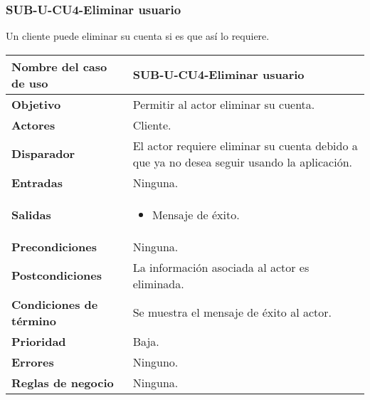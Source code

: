 \subsubsection{SUB-U-CU4-Eliminar usuario}\label{SUB-U-CU4}
Un cliente puede eliminar su cuenta si es que así lo requiere.

\begin{longtable}{|J{5cm}|J{10.3cm}|}
	\hline
	\textbf{Nombre del caso de uso} &
		SUB-U-CU4-Eliminar usuario \\ \hline
	\textbf{Objetivo} &
		Permitir al actor eliminar su cuenta. \\ \hline
	\textbf{Actores} &
		Cliente. \\ \hline 
	\textbf{Disparador} & 
		El actor requiere eliminar su cuenta debido a que ya no desea seguir usando la aplicación.\\ \hline 
	\textbf{Entradas} & Ninguna.
		\\ \hline 
	\textbf{Salidas} & 
		\begin{itemize}
			\item Mensaje de éxito.
		\end{itemize} \\ \hline
	\textbf{Precondiciones} &
		Ninguna.\\ \hline
	\textbf{Postcondiciones} & La información asociada al actor es eliminada.
		\\ \hline
	\textbf{Condiciones de término} & Se muestra el mensaje de éxito al actor.
		\\ \hline 
	\textbf{Prioridad} & 
		Baja. \\ \hline
	\textbf{Errores} & Ninguno.
		\\ \hline
	\textbf{Reglas de negocio} & Ninguna.
		 \\ \hline
\end{longtable}

